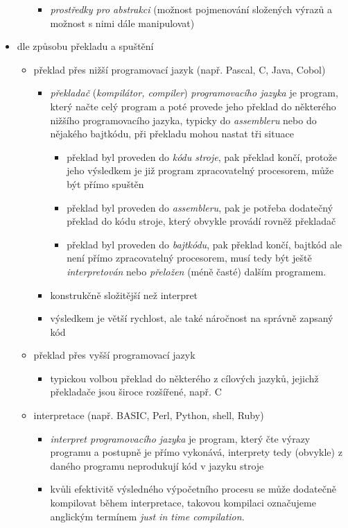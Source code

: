 \documentclass[10pt,a4paper]{article}
\begin{document}
\begin{itemize}
\begin{itemize}
\begin{itemize}
            \item \textit{prostředky pro abstrakci} (možnost pojmenování složených výrazů a možnost s nimi dále manipulovat)
          \end{itemize}
        \end{itemize}
        \item dle způsobu překladu a spuštění
        \begin{itemize}
          \item překlad přes nižší programovací jazyk (např. Pascal, C, Java, Cobol)
          \begin{itemize}
            \item \textit{překladač} (\textit{kompilátor, compiler}) \textit{programovacího jazyka} je program, který načte celý program a poté provede jeho překlad do některého nižšího programovacího jazyka, typicky do \textit{assembleru} nebo do nějakého bajtkódu, při překladu mohou nastat tři situace
            \begin{itemize}
              \item překlad byl proveden do \textit{kódu stroje}, pak překlad končí, protože jeho výsledkem je již program zpracovatelný procesorem, může být přímo spuštěn
              \item překlad byl proveden do \textit{assembleru}, pak je potřeba dodatečný překlad do kódu stroje, který obvykle provádí rovněž překladač
              \item překlad byl proveden do \textit{bajtkódu}, pak překlad končí, bajtkód ale není přímo zpracovatelný procesorem, musí tedy být ještě \textit{interpretován} nebo \textit{přeložen} (méně časté) dalším programem.
            \end{itemize}
            \item konstrukčně složitější než interpret
            \item výsledkem je větší rychlost, ale také náročnost na správně zapsaný kód
          \end{itemize}
          \item překlad přes vyšší programovací jazyk
          \begin{itemize}
            \item typickou volbou překlad do některého z cílových jazyků, jejichž překladače jsou široce rozšířené, např. C
          \end{itemize}
          \item interpretace (např. BASIC, Perl, Python, shell, Ruby)
          \begin{itemize}
            \item \textit{interpret programovacího jazyka} je program, který čte výrazy programu a postupně je přímo vykonává, interprety tedy (obvykle) z daného programu neprodukují kód v jazyku stroje
            \item kvůli efektivitě výsledného výpočetního procesu se může dodatečně kompilovat během interpretace, takovou kompilaci označujeme anglickým termínem \textit{just in time compilation}.
          \end{itemize}
        \end{itemize}
      \end{itemize}
\end{document}
